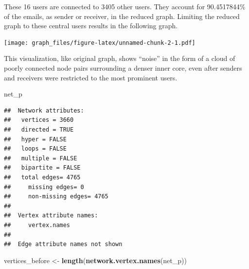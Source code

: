 \documentclass[]{article}
\newenvironment{Shaded}{\begin{snugshade}}{\end{snugshade}}
\newcommand{\DataTypeTok}[1]{\textcolor[rgb]{0.13,0.29,0.53}{#1}}
\newcommand{\FloatTok}[1]{\textcolor[rgb]{0.00,0.00,0.81}{#1}}
\newcommand{\KeywordTok}[1]{\textcolor[rgb]{0.13,0.29,0.53}{\textbf{#1}}}
\newcommand{\NormalTok}[1]{#1}
\newcommand{\OperatorTok}[1]{\textcolor[rgb]{0.81,0.36,0.00}{\textbf{#1}}}
\newcommand{\StringTok}[1]{\textcolor[rgb]{0.31,0.60,0.02}{#1}}
\begin{document}
These 16 users are connected to 3405 other users. They account for
90.4517844\% of the emails, as sender or receiver, in the reduced graph.
Limiting the reduced graph to these central users results in the
following graph.

\begin{Shaded}
\end{Shaded}

\texttt{[image: graph\_files/figure-latex/unnamed-chunk-2-1.pdf]}

This visualization, like original graph, shows ``noise'' in the form of
a cloud of poorly connected node pairs surrounding a denser inner core,
even after senders and receivers were restricted to the most prominent
users.

\begin{Shaded}
\begin{Highlighting}[]
\NormalTok{net_p}
\end{Highlighting}
\end{Shaded}

\begin{verbatim}
##  Network attributes:
##   vertices = 3660 
##   directed = TRUE 
##   hyper = FALSE 
##   loops = FALSE 
##   multiple = FALSE 
##   bipartite = FALSE 
##   total edges= 4765 
##     missing edges= 0 
##     non-missing edges= 4765 
## 
##  Vertex attribute names: 
##     vertex.names 
## 
##  Edge attribute names not shown
\end{verbatim}

\begin{Shaded}
\begin{Highlighting}[]
\NormalTok{vertices_before <-}\StringTok{ }\KeywordTok{length}\NormalTok{(}\KeywordTok{network.vertex.names}\NormalTok{(net_p))}
\end{Highlighting}
\end{Shaded}
\end{document}
